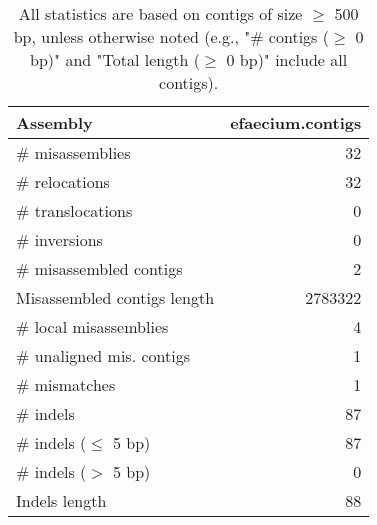 \documentclass[12pt,a4paper]{article}
\begin{document}
\begin{table}[ht]
\begin{center}
\caption{All statistics are based on contigs of size $\geq$ 500 bp, unless otherwise noted (e.g., "\# contigs ($\geq$ 0 bp)" and "Total length ($\geq$ 0 bp)" include all contigs).}
\begin{tabular}{|l*{1}{|r}|}
\hline
Assembly & efaecium.contigs \\ \hline
\# misassemblies & 32 \\ \hline
\hspace{5mm}\# relocations & 32 \\ \hline
\hspace{5mm}\# translocations & 0 \\ \hline
\hspace{5mm}\# inversions & 0 \\ \hline
\# misassembled contigs & 2 \\ \hline
Misassembled contigs length & 2783322 \\ \hline
\# local misassemblies & 4 \\ \hline
\# unaligned mis. contigs & 1 \\ \hline
\# mismatches & 1 \\ \hline
\# indels & 87 \\ \hline
\hspace{5mm}\# indels ($\leq$ 5 bp) & 87 \\ \hline
\hspace{5mm}\# indels ($>$ 5 bp) & 0 \\ \hline
Indels length & 88 \\ \hline
\end{tabular}
\end{center}
\end{table}
\end{document}
